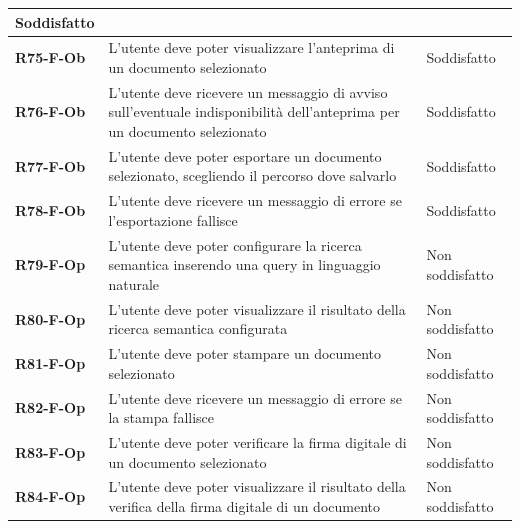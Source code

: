 \documentclass[a4paper,12pt]{article}
\begin{document}
{{{\begin{longtable}{|>{\centering\arraybackslash}m{}|>{\centering\arraybackslash}m{}|>{\centering\arraybackslash}m{}|}
                Soddisfatto \\ 
                \hline
                \textbf{R75-F-Ob} & L'utente deve poter visualizzare l'anteprima di un documento selezionato & 
                Soddisfatto \\ 
                \hline
                \textbf{R76-F-Ob} & L'utente deve ricevere un messaggio di avviso sull'eventuale indisponibilità dell'anteprima per un documento selezionato & 
                Soddisfatto \\ 
                \hline
                \textbf{R77-F-Ob} & L'utente deve poter esportare un documento selezionato, scegliendo il percorso dove salvarlo & 
                Soddisfatto \\ 
                \hline
                \textbf{R78-F-Ob} & L'utente deve ricevere un messaggio di errore se l'esportazione fallisce & 
                Soddisfatto \\ 
                \hline
                \textbf{R79-F-Op} & L'utente deve poter configurare la ricerca semantica inserendo una query in linguaggio naturale & 
                Non soddisfatto \\ 
                \hline
                \textbf{R80-F-Op} & L'utente deve poter visualizzare il risultato della ricerca semantica configurata & 
                Non soddisfatto \\ 
                \hline
                \textbf{R81-F-Op} & L'utente deve poter stampare un documento selezionato & 
                Non soddisfatto \\ 
                \hline
                \textbf{R82-F-Op} & L'utente deve ricevere un messaggio di errore se la stampa fallisce & 
                Non soddisfatto \\ 
                \hline
                \textbf{R83-F-Op} & L'utente deve poter verificare la firma digitale di un documento selezionato & 
                Non soddisfatto \\ 
                \hline
                \textbf{R84-F-Op} & L'utente deve poter visualizzare il risultato della verifica della firma digitale di un documento & 
                Non soddisfatto \\ 
                \hline
            \end{longtable}
        }
}}
\end{document}
